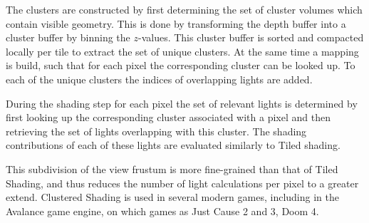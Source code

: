 The clusters are constructed by first determining the set of cluster volumes which contain
visible geometry. This is done by transforming the depth buffer into a cluster buffer by
binning the $z$-values. This cluster buffer is sorted and compacted locally per tile to
extract the set of unique clusters. At the same time a mapping is build, such that
for each pixel the corresponding cluster can be looked up.
To each of the unique clusters the indices of overlapping lights are added.

During the shading step for each pixel the set of relevant lights is determined
by first looking up the corresponding cluster associated with a pixel and then
retrieving the set of lights overlapping with this cluster. The shading contributions
of each of these lights are evaluated similarly to Tiled shading.

This subdivision of the view frustum is more fine-grained than that of Tiled Shading, and
thus reduces the number of light calculations per pixel to a greater extend.
Clustered Shading is used in several modern games, including in the Avalance
game engine, on which games as Just Cause 2 and 3\cite{persson2013practical},
Doom 4\cite{Tatarchuk:2016:ARR:2897826.2940292}.





